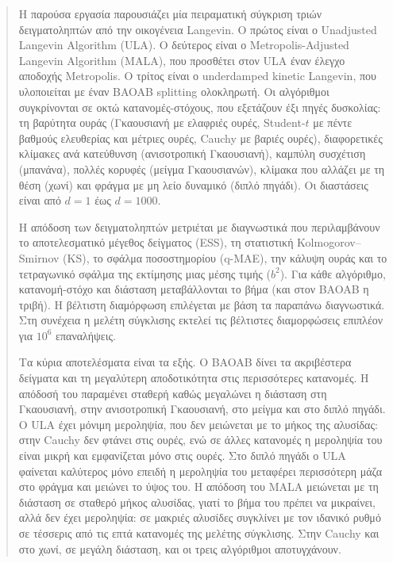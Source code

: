 \documentclass[11pt,a4paper]{report}
\begin{document}



\begin{abstract}
\noindent
Η παρούσα εργασία παρουσιάζει μία πειραματική σύγκριση τριών δειγματοληπτών από την
οικογένεια Langevin. Ο πρώτος είναι ο Unadjusted Langevin Algorithm (ULA). Ο δεύτερος είναι ο
Metropolis-Adjusted Langevin Algorithm (MALA), που προσθέτει στον ULA έναν έλεγχο
αποδοχής Metropolis. Ο τρίτος είναι ο underdamped kinetic Langevin, που υλοποιείται με έναν
BAOAB splitting ολοκληρωτή. Οι αλγόριθμοι συγκρίνονται σε οκτώ κατανομές-στόχους,
που εξετάζουν έξι πηγές δυσκολίας: τη βαρύτητα ουράς (Γκαουσιανή με ελαφριές ουρές,
Student-$t$ με πέντε βαθμούς ελευθερίας και μέτριες ουρές, Cauchy με βαριές ουρές),
διαφορετικές κλίμακες ανά κατεύθυνση (ανισοτροπική
Γκαουσιανή), καμπύλη συσχέτιση (μπανάνα), πολλές κορυφές (μείγμα Γκαουσιανών),
κλίμακα που αλλάζει με τη θέση (χωνί) και φράγμα με μη λείο δυναμικό (διπλό πηγάδι).
Οι διαστάσεις είναι από $d=1$ έως $d=1000$.

Η απόδοση των δειγματοληπτών μετριέται με
διαγνωστικά που περιλαμβάνουν το αποτελεσματικό μέγεθος δείγματος (ESS), τη στατιστική
Kolmogorov--Smirnov (KS), το σφάλμα ποσοστημορίου (q-MAE), την κάλυψη ουράς και το
τετραγωνικό σφάλμα της εκτίμησης μιας μέσης τιμής ($b^2$).
Για κάθε αλγόριθμο, κατανομή-στόχο και διάσταση μεταβάλλονται το βήμα (και στον BAOAB η
τριβή). Η βέλτιστη διαμόρφωση επιλέγεται με βάση τα παραπάνω διαγνωστικά.
Στη συνέχεια η μελέτη σύγκλισης εκτελεί τις βέλτιστες διαμορφώσεις επιπλέον για $10^6$ επαναλήψεις.

Τα κύρια αποτελέσματα είναι τα εξής. Ο BAOAB δίνει τα ακριβέστερα δείγματα και τη
μεγαλύτερη αποδοτικότητα στις περισσότερες κατανομές. Η απόδοσή του παραμένει σταθερή
καθώς μεγαλώνει η διάσταση στη Γκαουσιανή, στην ανισοτροπική Γκαουσιανή, στο μείγμα
και στο διπλό πηγάδι. Ο ULA έχει μόνιμη μεροληψία, που δεν μειώνεται με το μήκος της
αλυσίδας: στην Cauchy δεν φτάνει στις ουρές, ενώ σε άλλες κατανομές η μεροληψία του
είναι μικρή και εμφανίζεται μόνο στις ουρές. Στο διπλό πηγάδι ο ULA φαίνεται καλύτερος
μόνο επειδή η μεροληψία του μεταφέρει περισσότερη μάζα στο φράγμα και μειώνει το ύψος του. Η απόδοση του MALA
μειώνεται με τη διάσταση σε σταθερό μήκος αλυσίδας, γιατί το βήμα του πρέπει να
μικραίνει, αλλά δεν έχει μεροληψία: σε μακριές αλυσίδες συγκλίνει με τον ιδανικό ρυθμό
σε τέσσερις από τις επτά κατανομές της μελέτης σύγκλισης. Στην Cauchy και στο χωνί, σε μεγάλη διάσταση, και οι
τρεις αλγόριθμοι αποτυγχάνουν.
\end{abstract}
\end{document}

